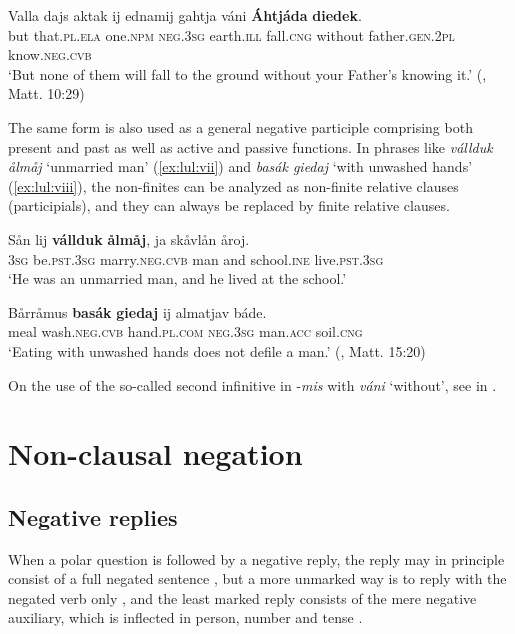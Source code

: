 \documentclass[output=paper,colorlinks,citecolor=brown]{langscibook}
\begin{document}
\ea\label{ex:lul:29} 
    \gll Valla dajs aktak ij ednamij gahtja váni \textbf{Áhtjáda} \textbf{diedek}.\\ 
         but that\textsc{.pl.ela} one.\textsc{npm} \textsc{neg.3sg} earth.\textsc{ill} fall.\textsc{cng} without father.\textsc{gen.2pl} know.\textsc{neg.cvb}  \\
    \glt  ‘But none of them will fall to the ground without your Father’s knowing it.’ (\citealt{SIKOR2021}, Matt. 10:29)
\z 

The same form is also used as a general negative participle comprising both
present and past as well as active and passive functions. In phrases like \textit{vállduk ålmåj} ‘unmarried man’ (\ref{ex:lul:vii}) and \textit{basák giedaj} ‘with unwashed hands’ (\ref{ex:lul:viii}), the non-finites can be analyzed as non-finite relative clauses (participials), and they can always be replaced by finite relative clauses.

\ea\label{ex:lul:vii}
\gll Sån lij \textbf{vállduk} \textbf{ålmåj}, ja skåvlån åroj.\\
    \textsc{3sg} be.\textsc{pst.3sg} marry.\textsc{neg.cvb} man and school.\textsc{ine} live.\textsc{pst.3sg}\\
\glt ‘He was an unmarried man, and he lived at the school.’  \citep{SIKOR2021}\\
\z 

\ea\label{ex:lul:viii}
\gll Bårråmus \textbf{basák} \textbf{giedaj} ij almatjav báde.\\
    meal wash.\textsc{neg.cvb} hand.\textsc{pl.com} \textsc{neg.3sg} man.\textsc{acc} soil.\textsc{cng}\\
\glt ‘Eating with unwashed hands does not defile a man.’ (\citealt{SIKOR2021}, Matt. 15:20)\\
\z 

On the use of the so-called second infinitive in -\textit{mis} with \textit{váni} ‘without’, see  in . 


\section{Non-clausal negation} \label{sec:lul:3}
\subsection{Negative replies} \label{sec:lul:3.1}

When a polar question is followed by a negative reply, the reply may in principle consist of a full negated sentence , but a more unmarked way is to reply with the negated verb only , and the least marked reply consists of the mere negative auxiliary, which is inflected in person, number and tense .
\end{document}
